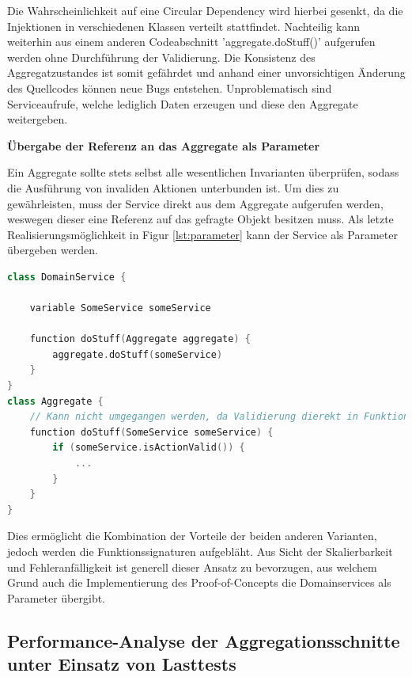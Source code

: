 Die Wahrscheinlichkeit auf eine Circular Dependency wird hierbei gesenkt, da die Injektionen in verschiedenen Klassen verteilt stattfindet. Nachteilig kann weiterhin aus einem anderen Codeabschnitt 'aggregate.doStuff()' aufgerufen werden ohne Durchführung der Validierung. Die Konsistenz des Aggregatzustandes ist somit gefährdet und anhand einer unvorsichtigen Änderung des Quellcodes können neue Bugs entstehen. Unproblematisch sind Serviceaufrufe, welche lediglich Daten erzeugen und diese den Aggregate weitergeben.

\textbf{Übergabe der Referenz an das Aggregate als Parameter}

Ein Aggregate sollte stets selbst alle wesentlichen Invarianten überprüfen, sodass die Ausführung von invaliden Aktionen unterbunden ist. Um dies zu gewährleisten, muss der Service direkt aus dem Aggregate aufgerufen werden, weswegen dieser eine Referenz auf das gefragte Objekt besitzen muss. Als letzte Realisierungsmöglichkeit in Figur \ref{lst:parameter} kann der Service als Parameter übergeben werden.

\begin{minipage}{\linewidth} %
	\begin{lstlisting}[caption={Übergabe der Referenz an das Aggregate als Parameter}, label={lst:parameter}, language=Kotlin]
class DomainService {
	
	variable SomeService someService
	
	function doStuff(Aggregate aggregate) {
		aggregate.doStuff(someService)
	}
}
class Aggregate {
	// Kann nicht umgegangen werden, da Validierung dierekt in Funktion geschieht
	function doStuff(SomeService someService) {
		if (someService.isActionValid()) {
			...
		}
	}
}
	\end{lstlisting}
\end{minipage}

Dies ermöglicht die Kombination der Vorteile der beiden anderen Varianten, jedoch werden die Funktionssignaturen aufgebläht. Aus Sicht der Skalierbarkeit und Fehleranfälligkeit ist generell dieser Ansatz zu bevorzugen, aus welchem Grund auch die Implementierung des Proof-of-Concepts die Domainservices als Parameter übergibt.

\subsection{Performance-Analyse der Aggregationsschnitte unter Einsatz von Lasttests}

